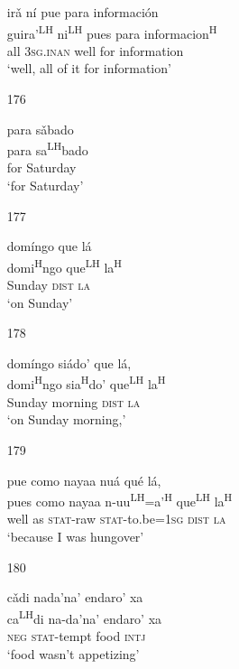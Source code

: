 \begin{itemize}
\glll   ir\v{a} n\'{i} pue para informaci\'{o}n \\
guira'\textsuperscript{LH} ni\textsuperscript{LH} pues para informacion\textsuperscript{H} \\
all \textsc{3sg.inan} well for information\\
\glt `well, all of it for information'
 


\item[176]
 
\glll   para s\v{a}bado \\
 para sa\textsuperscript{LH}bado\\
for Saturday\\
\glt `for Saturday'
 

\item[177]
 
\glll   dom\'{i}ngo que l\'{a}\\
 domi\textsuperscript{H}ngo que\textsuperscript{LH} la\textsuperscript{H}\\
Sunday \textsc{dist} \textsc{la}\\
\glt `on Sunday'
 

\item[178]
 
\glll   dom\'{i}ngo si\'{a}do' que l\'{a}, \\
 domi\textsuperscript{H}ngo sia\textsuperscript{H}do' que\textsuperscript{LH} la\textsuperscript{H}\\
Sunday morning \textsc{dist} \textsc{la}\\
\glt `on Sunday morning,'
 


\item[179]
 
\glll   pue como nayaa nu\'{a} qu\'{e} l\'{a},\\
pues como nayaa n-uu\textsuperscript{LH}=a'\textsuperscript{H} que\textsuperscript{LH} la\textsuperscript{H}\\
well as \textsc{stat}-raw \textsc{stat}-to.be=\textsc{1sg} \textsc{dist} \textsc{la}\\
\glt `because I was hungover'
 


\item[180]
 
\glll   c\v{a}di nada'na' endaro' xa\\
ca\textsuperscript{LH}di na-da'na' endaro' xa \\
\textsc{neg} \textsc{stat}-tempt  food \textsc{intj}\\
\glt `food wasn't appetizing'
 


\end{itemize}
